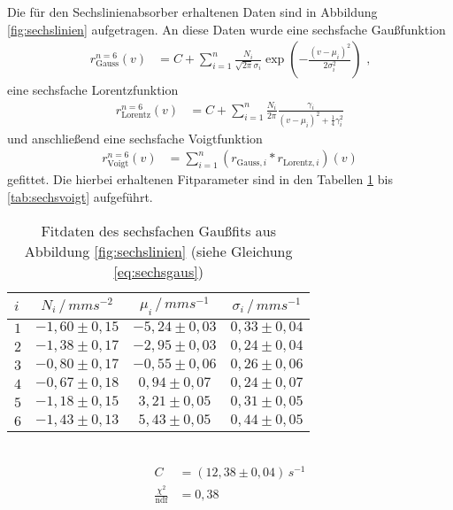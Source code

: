 Die für den Sechslinienabsorber erhaltenen Daten sind in Abbildung \ref{fig:sechslinien} aufgetragen. An diese Daten wurde eine sechsfache Gaußfunktion
\begin{align}
r_\mathrm{Gauss}^{n=6}(v)&=C+\sum_{i=1}^n\frac{N_i}{\sqrt{2\pi}\sigma_i}\exp(-\frac{(v-\mu_i)^2}{2\sigma_i^2})\text{ ,}\label{eq:sechsgaus}
\end{align}
eine sechsfache Lorentzfunktion 
\begin{align}
r_\mathrm{Lorentz}^{n=6}(v)&=C+\sum_{i=1}^n\frac{N_i}{2\pi}\frac{\gamma_i}{\left(v-\mu_i\right)^2+\frac14\gamma_i^2}\label{eq:sechslorentz}
\end{align}
und anschließend eine sechsfache Voigtfunktion 
\begin{align}
r_\mathrm{Voigt}^{n=6}(v)&=\sum_{i=1}^n\left(r_{\mathrm{Gauss}, i}*r_{\mathrm{Lorentz}, i}\right)(v)\label{eq:sechsvoigt}
\end{align}
gefittet. Die hierbei erhaltenen Fitparameter sind in den Tabellen \ref{tab:sechsgaus} bis \ref{tab:sechsvoigt} aufgeführt.\\

\begin{table}[h!]
	\centering
	\begin{tabular}{l|ccc}
		$i$&$N_i\,/\,\si{mms^{-2}}$&$\mu_i\,/\,\si{mms^{-1}}$&$\sigma_i\,/\,\si{mms^{-1}}$\\\hline
		$1$&$-1,60\pm0,15$&$-5,24\pm0,03$&$0,33\pm0,04$\\
		$2$&$-1,38\pm0,17$&$-2,95\pm0,03$&$0,24\pm0,04$\\
		$3$&$-0,80\pm0,17$&$-0,55\pm0,06$&$0,26\pm0,06$\\
		$4$&$-0,67\pm0,18$&$ 0,94\pm0,07$&$0,24\pm0,07$\\
		$5$&$-1,18\pm0,15$&$ 3,21\pm0,05$&$0,31\pm0,05$\\
		$6$&$-1,43\pm0,13$&$ 5,43\pm0,05$&$0,44\pm0,05$\\
	\end{tabular}\\
	\begin{align*}
		C&=(12,38\pm0,04)\,\si{s^{-1}}\\
		\frac{\chi^2}{\mathrm{ndf}}&=0,38
	\end{align*}
	\caption[Fitdaten des sechsfachen Gaußfits]{Fitdaten des sechsfachen Gaußfits aus Abbildung \ref{fig:sechslinien} (siehe Gleichung \ref{eq:sechsgaus})}
	\label{tab:sechsgaus}
\end{table}

